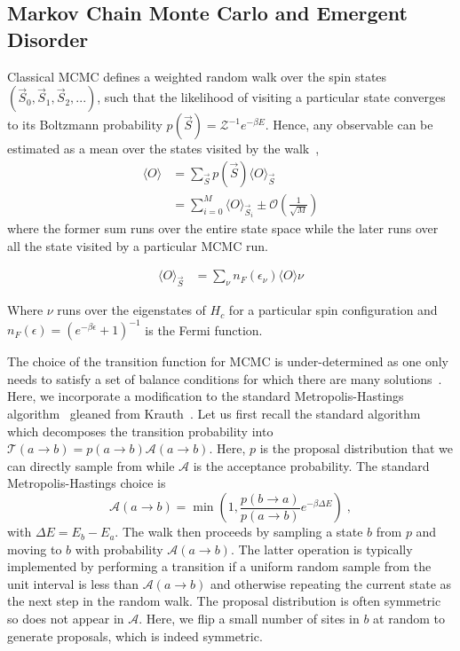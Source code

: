 \hypertarget{markov-chain-monte-carlo-and-emergent-disorder}{%
\subsection{Markov Chain Monte Carlo and Emergent Disorder}\label{markov-chain-monte-carlo-and-emergent-disorder}}

Classical MCMC defines a weighted random walk over the spin states \((\vec{S}_0, \vec{S}_1, \vec{S}_2, ...)\), such that the likelihood of visiting a particular state converges to its Boltzmann probability \(p(\vec{S}) = \mathcal{Z}^{-1} e^{-\beta E}\). Hence, any observable can be estimated as a mean over the states visited by the walk~\autocite{binderGuidePracticalWork1988,kerteszAdvancesComputerSimulation1998,wolffMonteCarloErrors2004}, \[\begin{aligned}
\label{eq:thermal_expectation}
\langle O \rangle & = \sum_{\vec{S}} p(\vec{S}) \langle O \rangle_{\vec{S}}\\
                  & = \sum_{i = 0}^{M} \langle O\rangle_{\vec{S}_i} \pm \mathcal{O}(\tfrac{1}{\sqrt{M}})
\end{aligned}\] where the former sum runs over the entire state space while the later runs over all the state visited by a particular MCMC run.

\[\begin{aligned}
\langle O \rangle_{\vec{S}}& = \sum_{\nu} n_F(\epsilon_{\nu}) \langle O \rangle{\nu}
\end{aligned}\]

Where \(\nu\) runs over the eigenstates of \(H_c\) for a particular spin configuration and \(n_F(\epsilon) = \left(e^{-\beta\epsilon} + 1\right)^{-1}\) is the Fermi function.

The choice of the transition function for MCMC is under-determined as one only needs to satisfy a set of balance conditions for which there are many solutions~\autocite{kellyReversibilityStochasticNetworks1981}. Here, we incorporate a modification to the standard Metropolis-Hastings algorithm~\autocite{hastingsMonteCarloSampling1970} gleaned from Krauth~\autocite{krauthIntroductionMonteCarlo1998}. Let us first recall the standard algorithm which decomposes the transition probability into \(\mathcal{T}(a \to b) = p(a \to b)\mathcal{A}(a \to b)\). Here, \(p\) is the proposal distribution that we can directly sample from while \(\mathcal{A}\) is the acceptance probability. The standard Metropolis-Hastings choice is \[\mathcal{A}(a \to b) = \min\left(1, \frac{p(b\to a)}{p(a\to b)} e^{-\beta \Delta E}\right)\;,\] with \(\Delta E = E_b - E_a\). The walk then proceeds by sampling a state \(b\) from \(p\) and moving to \(b\) with probability \(\mathcal{A}(a \to b)\). The latter operation is typically implemented by performing a transition if a uniform random sample from the unit interval is less than \(\mathcal{A}(a \to b)\) and otherwise repeating the current state as the next step in the random walk. The proposal distribution is often symmetric so does not appear in \(\mathcal{A}\). Here, we flip a small number of sites in \(b\) at random to generate proposals, which is indeed symmetric.

